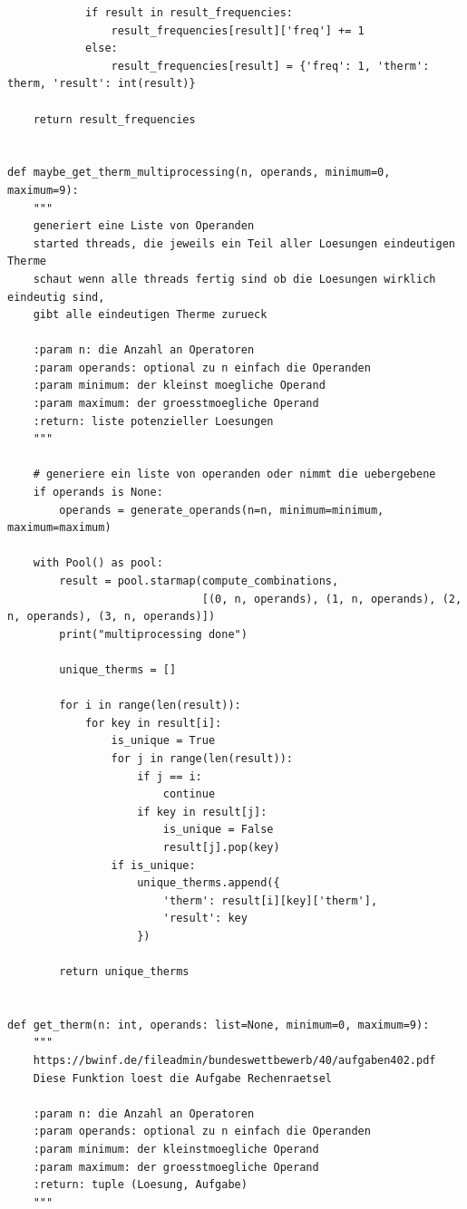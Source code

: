 \documentclass[a4paper,10pt,ngerman]{scrartcl}
\begin{document}
\begin{lstlisting}
            if result in result_frequencies:
                result_frequencies[result]['freq'] += 1
            else:
                result_frequencies[result] = {'freq': 1, 'therm': therm, 'result': int(result)}

    return result_frequencies


def maybe_get_therm_multiprocessing(n, operands, minimum=0, maximum=9):
    """
    generiert eine Liste von Operanden
    started threads, die jeweils ein Teil aller Loesungen eindeutigen Therme
    schaut wenn alle threads fertig sind ob die Loesungen wirklich eindeutig sind,
    gibt alle eindeutigen Therme zurueck

    :param n: die Anzahl an Operatoren
    :param operands: optional zu n einfach die Operanden
    :param minimum: der kleinst moegliche Operand
    :param maximum: der groesstmoegliche Operand
    :return: liste potenzieller Loesungen
    """

    # generiere ein liste von operanden oder nimmt die uebergebene
    if operands is None:
        operands = generate_operands(n=n, minimum=minimum, maximum=maximum)

    with Pool() as pool:
        result = pool.starmap(compute_combinations,
                              [(0, n, operands), (1, n, operands), (2, n, operands), (3, n, operands)])
        print("multiprocessing done")

        unique_therms = []

        for i in range(len(result)):
            for key in result[i]:
                is_unique = True
                for j in range(len(result)):
                    if j == i:
                        continue
                    if key in result[j]:
                        is_unique = False
                        result[j].pop(key)
                if is_unique:
                    unique_therms.append({
                        'therm': result[i][key]['therm'],
                        'result': key
                    })

        return unique_therms


def get_therm(n: int, operands: list=None, minimum=0, maximum=9):
    """
    https://bwinf.de/fileadmin/bundeswettbewerb/40/aufgaben402.pdf
    Diese Funktion loest die Aufgabe Rechenraetsel

    :param n: die Anzahl an Operatoren
    :param operands: optional zu n einfach die Operanden
    :param minimum: der kleinstmoegliche Operand
    :param maximum: der groesstmoegliche Operand
    :return: tuple (Loesung, Aufgabe)
    """


\end{lstlisting}
\end{document}
